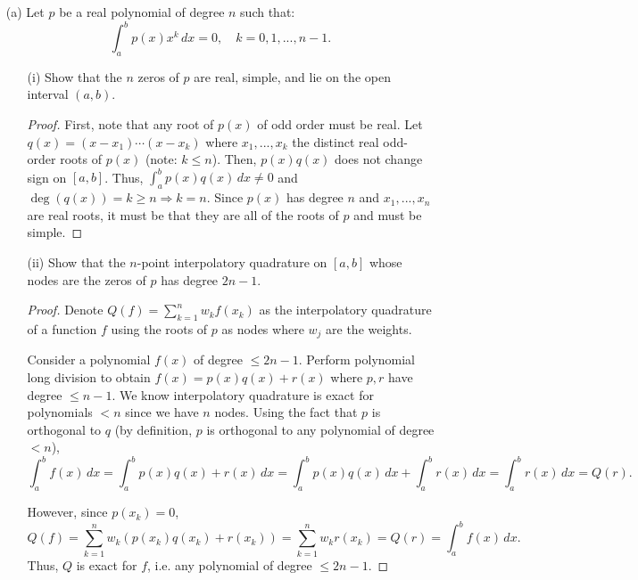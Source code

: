 \documentclass[10pt]{article}
\begin{document}
\newpage


\begin{itemize}

\item[(a)] Let $p$ be a real polynomial of degree $n$ such that: $$
\int_{a}^b p(x) x^k \, dx = 0, \quad k = 0, 1, ..., n-1.
$$ \begin{itemize}
\item[(i)] Show that the $n$ zeros of $p$ are real, simple, and lie on the open interval $ (a,b) $.

\begin{proof}
First, note that any root of $p(x)$ of odd order must be real.
Let $ q(x) = (x - x_1) \cdots (x - x_k) $ where $ x_1, ... , x_k $ the distinct real odd-order roots of $ p(x) $ (note: $ k \leq n $). Then, $ p(x)q(x) $ does not change sign on $ [a,b] $. Thus, $ \int_{a}^b p(x)q(x) \, dx \neq 0 $ and $ \deg(q(x)) = k \geq n \Rightarrow k = n $. Since $p(x)$ has degree $n$ and $ x_1, ... , x_n $ are real roots, it must be that they are all of the roots of $p$ and must be simple.
\end{proof}

\item[(ii)] Show that the $n$-point interpolatory quadrature on $ [a,b] $ whose nodes are the zeros of $p$ has degree $2n-1$.

\begin{proof}
Denote $ Q(f) = \sum_{k=1}^n w_k f(x_k) $ as the interpolatory quadrature of a function $f$ using the roots of $p$ as nodes where $ w_j $ are the weights.

Consider a polynomial $ f(x) $ of degree $ \leq 2n - 1 $. Perform polynomial long division to obtain $ f(x) = p(x)q(x) + r(x) $ where $ p,r $ have degree $ \leq n-1 $. We know interpolatory quadrature is exact for polynomials $ < n $ since we have $n$ nodes. Using the fact that $p$ is orthogonal to $q$ (by definition, $p$ is orthogonal to any polynomial of degree $ < n $), $$
\int_a^b f(x) \, dx = \int_a^b p(x)q(x) + r(x) \, dx = \int_a^b p(x)q(x) \, dx + \int_a^b r(x) \, dx = \int_a^b r(x) \, dx = Q(r). $$

However, since $ p(x_k) = 0 $, $$
Q(f) = \sum_{k = 1}^n w_k ( p(x_k)q(x_k) + r(x_k) ) = \sum_{k = 1}^n w_k  r(x_k) = Q(r) = \int_a^b f(x) \, dx.
$$ Thus, $ Q $ is exact for $f$, i.e. any polynomial of degree $ \leq 2n-1 $.
\end{proof}
\end{itemize}


\end{itemize}
\end{document}
